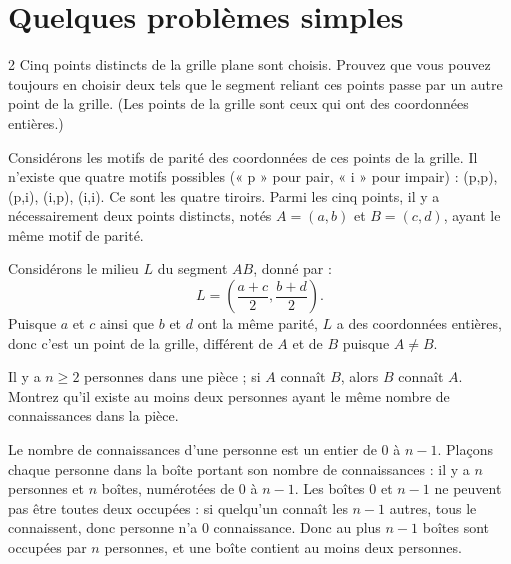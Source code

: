 \section*{Quelques problèmes simples}
\begin{problem}
    \begin{multicols}{2}
        Cinq points distincts de la grille plane sont choisis.
        Prouvez que vous pouvez toujours en choisir deux tels que le segment reliant ces points passe par un autre point de la grille.
        (Les points de la grille sont ceux qui ont des coordonnées entières.)

        \noindent{}
    \end{multicols}

    \begin{solution}
        Considérons les motifs de parité des coordonnées de ces points de la grille.
        Il n'existe que quatre motifs possibles (« p » pour pair, « i » pour impair) : (p,p), (p,i), (i,p), (i,i). Ce sont les quatre tiroirs. Parmi les cinq points, il y a nécessairement deux points distincts, notés \( A = (a,b) \) et \( B = (c,d) \), ayant le même motif de parité.

        Considérons le milieu \( L \) du segment \( AB \), donné par :
        \[
        L = \left( \frac{a+c}{2}, \frac{b+d}{2} \right).
        \]
        Puisque \( a \) et \( c \) ainsi que \( b \) et \( d \) ont la même parité, \( L \) a des coordonnées entières, donc c'est un point de la grille, différent de \( A \) et de \( B \) puisque \( A \neq B \).
    \end{solution}
\end{problem}

\begin{problem}
    Il y a \( n \geq 2 \) personnes dans une pièce ; si \( A \) connaît \( B \), alors \( B \) connaît \( A \).
    Montrez qu'il existe au moins deux personnes ayant le même nombre de connaissances dans la pièce.

    \begin{solution}
        Le nombre de connaissances d'une personne est un entier de \( 0 \) à \( n-1 \). Plaçons chaque personne dans la boîte portant son nombre de connaissances : il y a \( n \) personnes et \( n \) boîtes, numérotées de \( 0 \) à \( n-1 \).
        Les boîtes \( 0 \) et \( n-1 \) ne peuvent pas être toutes deux occupées : si quelqu'un connaît les \( n-1 \) autres, tous le connaissent, donc personne n'a \( 0 \) connaissance. Donc au plus \( n-1 \) boîtes sont occupées par \( n \) personnes, et une boîte contient au moins deux personnes.
    \end{solution}
\end{problem}

